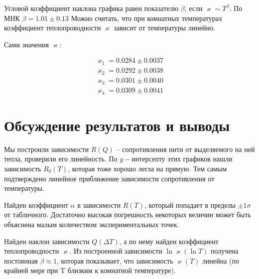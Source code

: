 \documentclass[a4paper,12pt]{report}
\begin{document}
    Угловой коэффициент наклона графика равен показателю $\beta$, если $\varkappa\sim T^\beta$. По МНК $\beta=1.01\pm 0.13 $ Можно считать, что при комнатных температурах коэффициент теплопроводности $\varkappa$ зависит от температуры линейно.

    Сами значения $\varkappa$:

    \begin{align*}
        \varkappa_1=0.0284\pm 0.0037 \\
        \varkappa_2=0.0292\pm 0.0038 \\
        \varkappa_3=0.0301\pm 0.0040 \\ 
        \varkappa_4=0.0309\pm 0.0041 
    \end{align*}
    
    \section*{Обсуждение результатов и выводы}
    Мы построили зависимости $R(Q)$ -- сопротивления нити от выделяемого на ней тепла, проверили его линейность. По $y-$интерсепту этих графиков нашли зависимость $R_0(T)$, которая тоже хорошо легла на прямую. Тем самым подтверждено линейное приближение зависимости сопротивления от температуры.
    
    Найден коэффициент $\alpha$ в зависимости $R(T)$, который попадает в пределы $\pm 1\sigma$ от табличного. Достаточно высокая погрешность некоторых величин может быть объяснена малым количеством экспериментальных точек.

    Найден наклон зависимости $Q(\Delta T)$, а по нему найден коэффициент теплопроводности $\varkappa$. Из построенной зависимости $\ln \varkappa (\ln T)$ получена постоянная $\beta\approx 1$, которая показывает, что зависимость $\varkappa (T)$ линейна (по крайней мере при T близким к комнатной температуре).

    \appendix
    \vspace{-3cm}
\end{document}
